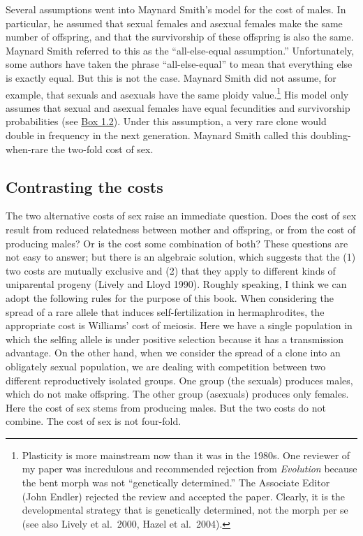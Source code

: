 \documentclass[
  letterpaper,
]{book}
\begin{document}
Several assumptions went into Maynard Smith's model for the cost of
males. In particular, he assumed that sexual females and asexual females
make the same number of offspring, and that the survivorship of these
offspring is also the same. Maynard Smith referred to this as the
``all-else-equal assumption.'' Unfortunately, some authors have taken
the phrase ``all-else-equal'' to mean that everything else is exactly
equal. But this is not the case. Maynard Smith did not assume, for
example, that sexuals and asexuals have the same ploidy
value.\footnote{Plasticity is more mainstream now than it was in the
  1980s. One reviewer of my paper was incredulous and recommended
  rejection from \emph{Evolution} because the bent morph was not
  ``genetically determined.'' The Associate Editor (John Endler)
  rejected the review and accepted the paper. Clearly, it is the
  developmental strategy that is genetically determined, not the morph
  per se (see also Lively et al.~2000, Hazel et al.~2004).} His model
only assumes that sexual and asexual females have equal fecundities and
survivorship probabilities (see \protect\hyperlink{callout-2}{Box 1.2}).
Under this assumption, a very rare clone would double in frequency in
the next generation. Maynard Smith called this doubling-when-rare the
two-fold cost of sex.

\hypertarget{contrasting-the-costs}{%
\subsection{Contrasting the costs}\label{contrasting-the-costs}}

The two alternative costs of sex raise an immediate question. Does the
cost of sex result from reduced relatedness between mother and
offspring, or from the cost of producing males? Or is the cost some
combination of both? These questions are not easy to answer; but there
is an algebraic solution, which suggests that the (1) two costs are
mutually exclusive and (2) that they apply to different kinds of
uniparental progeny (Lively and Lloyd 1990). Roughly speaking, I think
we can adopt the following rules for the purpose of this book. When
considering the spread of a rare allele that induces self-fertilization
in hermaphrodites, the appropriate cost is Williams' cost of meiosis.
Here we have a single population in which the selfing allele is under
positive selection because it has a transmission advantage. On the other
hand, when we consider the spread of a clone into an obligately sexual
population, we are dealing with competition between two different
reproductively isolated groups. One group (the sexuals) produces males,
which do not make offspring. The other group (asexuals) produces only
females. Here the cost of sex stems from producing males. But the two
costs do not combine. The cost of sex is not four-fold.
\end{document}
